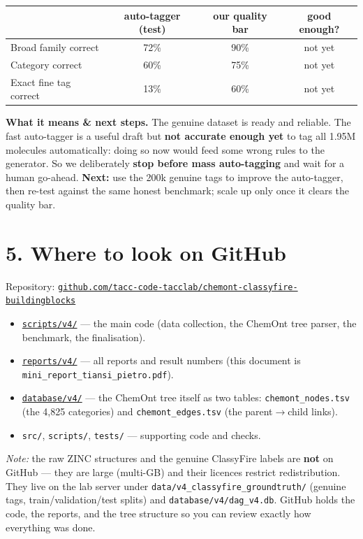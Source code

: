 \documentclass[11pt]{article}
\newcommand{\gh}{https://github.com/tacc-code-tacclab/chemont-classyfire-buildingblocks}
\begin{document}
\begin{center}
\begin{tabular}{lccc}
\toprule
 & \textbf{auto-tagger (test)} & \textbf{our quality bar} & \textbf{good enough?} \\
\midrule
Broad family correct   & 72\% & 90\% & not yet \\
Category correct       & 60\% & 75\% & not yet \\
Exact fine tag correct & 13\% & 60\% & not yet \\
\bottomrule
\end{tabular}
\end{center}

\noindent\textbf{What it means \& next steps.} The genuine dataset is ready and reliable. The fast
auto-tagger is a useful draft but \textbf{not accurate enough yet} to tag all 1.95M molecules
automatically: doing so now would feed some wrong rules to the generator. So we deliberately
\textbf{stop before mass auto-tagging} and wait for a human go-ahead. \textbf{Next:} use the 200k
genuine tags to improve the auto-tagger, then re-test against the same honest benchmark; scale up
only once it clears the quality bar.

\section*{5. Where to look on GitHub}
Repository: \href{\gh}{\texttt{github.com/tacc-code-tacclab/chemont-classyfire-buildingblocks}}
\begin{itemize}
  \item \href{\gh/tree/main/scripts/v4}{\texttt{scripts/v4/}} --- the main code (data collection,
        the ChemOnt tree parser, the benchmark, the finalisation).
  \item \href{\gh/tree/main/reports/v4}{\texttt{reports/v4/}} --- all reports and result numbers
        (this document is \texttt{mini\_report\_tiansi\_pietro.pdf}).
  \item \href{\gh/tree/main/database/v4}{\texttt{database/v4/}} --- the ChemOnt tree itself as two
        tables: \texttt{chemont\_nodes.tsv} (the 4{,}825 categories) and
        \texttt{chemont\_edges.tsv} (the parent$\rightarrow$child links).
  \item \texttt{src/}, \texttt{scripts/}, \texttt{tests/} --- supporting code and checks.
\end{itemize}
{\footnotesize\emph{Note:} the raw ZINC structures and the genuine ClassyFire labels are \textbf{not}
on GitHub --- they are large (multi-GB) and their licences restrict redistribution. They live on the
lab server under \texttt{data/v4\_classyfire\_groundtruth/} (genuine tags, train/validation/test
splits) and \texttt{database/v4/dag\_v4.db}. GitHub holds the code, the reports, and the tree
structure so you can review exactly how everything was done.}
\end{document}
